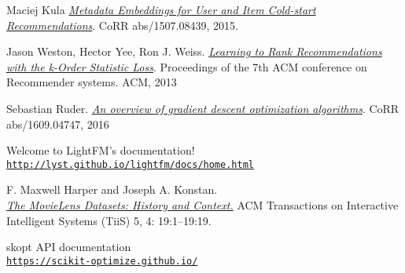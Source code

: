 \begin{thebibliography}{9}
	\hypertarget{maciejlightfm}{} 
	Maciej Kula
	\textit{\href{https://arxiv.org/pdf/1507.08439.pdf}{Metadata Embeddings for User and Item Cold-start Recommendations}}.
	CoRR abs/1507.08439, 2015.
	
	\hypertarget{jasonkos}{} 
	Jason Weston, Hector Yee, Ron J. Weiss.
	\textit{\href{https://static.googleusercontent.com/media/research.google.com/ro//pubs/archive/41534.pdf}{Learning to Rank Recommendations
with the k-Order Statistic Loss}}.
	Proceedings of the 7th ACM conference on Recommender systems. ACM, 2013
	
	\hypertarget{ruder2016}{} 
	Sebastian Ruder.
	\textit{\href{http://arxiv.org/abs/1609.04747}{An overview of gradient descent optimization algorithms}}.
	CoRR abs/1609.04747, 2016
	
	\hypertarget{lightfm}{} 
	Welcome to LightFM’s documentation!
	\\\texttt{\url{http://lyst.github.io/lightfm/docs/home.html}}
	
	\hypertarget{movielens}{} 
	F. Maxwell Harper and Joseph A. Konstan.
	\\\textit{\href{https://doi.org/10.1145/2827872}{The MovieLens Datasets: History and Context.}}
	ACM Transactions on Interactive Intelligent Systems (TiiS) 5, 4: 19:1–19:19.
	
	\hypertarget{skopt}{} 
	skopt API documentation
	\\\texttt{\url{https://scikit-optimize.github.io/}}
\end{thebibliography}
